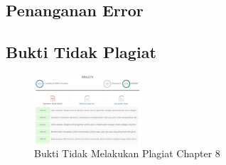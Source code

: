 \subsection{Penanganan Error}


\subsection{Bukti Tidak Plagiat}
\begin{figure}[H]
	\centering
	\includegraphics[width=4cm]{figures/1174008/8/bukticekplagiarismechapter8.PNG}
	\caption{Bukti Tidak Melakukan Plagiat Chapter 8}
\end{figure}